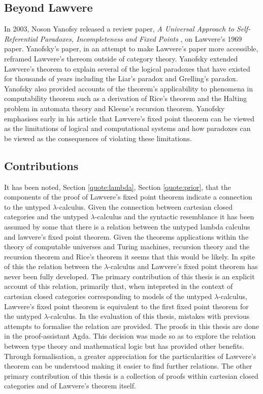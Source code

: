 \subsection{Beyond Lawvere}

In 2003, Noson Yanofsy released a review paper, \textit{A Universal Approach to
Self-Referential Paradoxes, Incompleteness and Fixed Points}
\cite{yanofsky2003universal}, on Lawvere's 1969
paper.  Yanofsky's paper, in an attempt to make Lawvere's paper more accessible,
reframed Lawvere's thereom outside of category theory. Yanofsky extended
Lawvere's theorem to explain several of the logical paradoxes that have existed
for thousands of years including the Liar's paradox and Grelling's paradox.
Yanofsky also provided accounts of the theorem's applicability to phenomena in
computability theorem such as a derivation of Rice's theorem  and the Halting
problem in automata theory and Kleene's recursion theorem. Yanofsky emphasises
early in his article that Lawvere's fixed point theorem can be viewed as the
limitations of logical and computational systems and how paradoxes can be viewed
as the consequences of violating these limitations.
\subsection{Contributions}
It has been noted, Section \ref{quote:lambda}, Section \ref{quote:prior}, that the components of the proof of Lawvere's fixed point
theorem indicate a connection to the untyped $\lambda$-calculus. Given the connection between cartesian closed categories and
the untyped $\lambda$-calculus and the syntactic resemblance it has been assumed by
some that there is a relation between the untyped lambda calculus and lawvere's
fixed point theorem. Given the theorems applications within the theory of
computable universes and Turing machines, recursion theory and the recursion
theorem and Rice's theorem it seems that this would be likely. In spite of this
the relation between the $\lambda$-calculus and Lawvere's fixed point theorem has
never been fully developed. The primary contribution of this thesis is an
explicit account of this relation, primarily that, when intepreted in the
context of cartesian closed categories corresponding to models of the untyped
$\lambda$-calculus, Lawvere's fixed point theorem is equivalent to the first
fixed point theorem for the untyped $\lambda$-calculus. In the evaluation of
this thesis, mistakes with previous attempts to formalise the relation are
provided. The proofs in this thesis are done in the proof-assistant Agda. This
decision was made so as to explore the relation between type theory and
mathematical logic but has provided other benefits. Through formalisation, a
greater appreciation for the particularities of Lawvere's theorem can be
understood making it easier to find further relations. The other primary
contribution of this thesis is a collection of proofs within cartesian closed
categories and of Lawvere's theorem itself.
